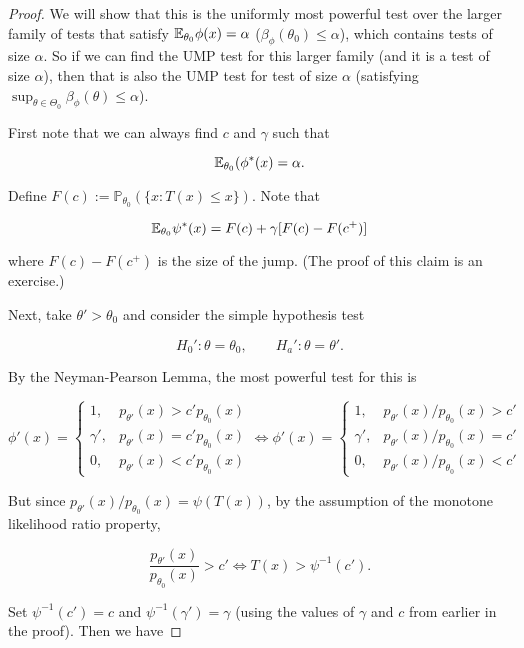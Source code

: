 \begin{proof}

We will show that this is the uniformly most powerful test over the larger family of tests that satisfy \(\E_{\theta_0} \phi(x) = \alpha\) (\(\beta_\phi(\theta_0) \leq \alpha\)), which contains tests of size \(\alpha\). So if we can find the UMP test for this larger family (and it is a test of size \(\alpha\)), then that is also the UMP test for test of size \(\alpha\) (satisfying \(\sup_{\theta \in \Theta_0} \beta_\phi(\theta) \leq \alpha\)).

First note that we can always find \(c\) and \(\gamma\) such that 

\[
\E_{\theta_0}(\phi^*(x) = \alpha.
\]

Define \(F(c) := \mathbb{P}_{\theta_0}( \{x: T(x) \leq x\})\). Note that

\[
\E_{\theta_0}\psi^*(x) = F(c) + \gamma[F(c) - F(c^+)]
\]

where \(F(c) - F(c^+)\) is the size of the jump. (The proof of this claim is an exercise.) 

Next, take \(\theta' > \theta_0\) and consider the simple hypothesis test

\[
H_{0}': \theta = \theta_0, \qquad H_a': \theta = \theta'.
\]

By the Neyman-Pearson Lemma, the most powerful test for this is 

\[
\phi'(x) = \begin{cases}
1, & p_{\theta'}(x) > c' p_{\theta_0}(x) \\
\gamma', &  p_{\theta'}(x) = c' p_{\theta_0}(x) \\
0, & p_{\theta'}(x) < c' p_{\theta_0}(x) 
\end{cases} \iff 
\phi'(x) = \begin{cases}
1, & p_{\theta'}(x)/  p_{\theta_0}(x) > c' \\
\gamma', &  p_{\theta'}(x)/  p_{\theta_0}(x) = c' \\
0, & p_{\theta'}(x)/ p_{\theta_0}(x)  < c' 
\end{cases}
\]

But since \( p_{\theta'}(x)/  p_{\theta_0}(x)  = \psi(T(x))\), by the assumption of the monotone likelihood ratio property,

\[
\frac{p_{\theta'}(x)}{  p_{\theta_0}(x)} > c' \iff T(x) > \psi^{-1}(c').
\]

Set \(\psi^{-1}(c') = c\) and \(\psi^{-1}(\gamma') = \gamma\) (using the values of \(\gamma\) and \(c\) from earlier in the proof). Then we have


\end{proof}
